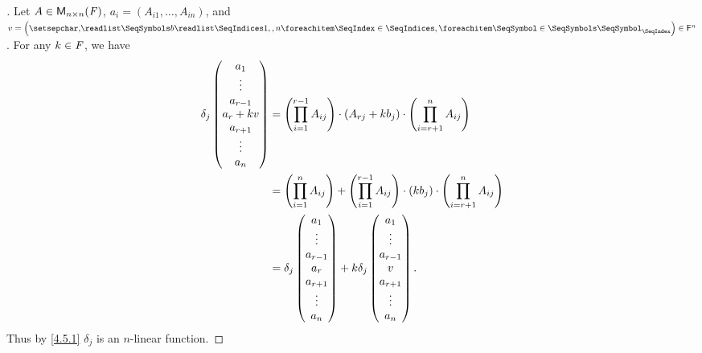 \begin{proof}[]
	Let \(A \in \mathsf{M}_{{n} \times n}({\mathit{F}})\), \(a_i = (A_{i 1}, \dots, A_{i n})\), and \(v = \tuple{b}{1,,n} \in \vs{F}^n\).
	For any \(k \in \mathit{F}\), we have
	\begin{align*}
		\delta_j\begin{pmatrix}
			        a_1       \\
			        \vdots    \\
			        a_{r - 1} \\
			        a_r + kv  \\
			        a_{r + 1} \\
			        \vdots    \\
			        a_n
		        \end{pmatrix} & = \left\lparen\prod_{i = 1}^{r - 1} A_{i j}\right\rparen \cdot (A_{r j} + k b_j) \cdot \left\lparen\prod_{i = r + 1}^n A_{i j}\right\rparen                        \\
		                        & = \left\lparen\prod_{i = 1}^n A_{i j}\right\rparen + \left\lparen\prod_{i = 1}^{r - 1} A_{i j}\right\rparen \cdot (k b_j) \cdot \left\lparen\prod_{i = r + 1}^n A_{i j}\right\rparen \\
		                        & = \delta_j\begin{pmatrix}
			                                    a_1       \\
			                                    \vdots    \\
			                                    a_{r - 1} \\
			                                    a_r       \\
			                                    a_{r + 1} \\
			                                    \vdots    \\
			                                    a_n
		                                    \end{pmatrix} + k \delta_j\begin{pmatrix}
			                                                              a_1       \\
			                                                              \vdots    \\
			                                                              a_{r - 1} \\
			                                                              v         \\
			                                                              a_{r + 1} \\
			                                                              \vdots    \\
			                                                              a_n
		                                                              \end{pmatrix}.
	\end{align*}
	Thus by \cref{4.5.1} \(\delta_j\) is an \(n\)-linear function.
\end{proof}

